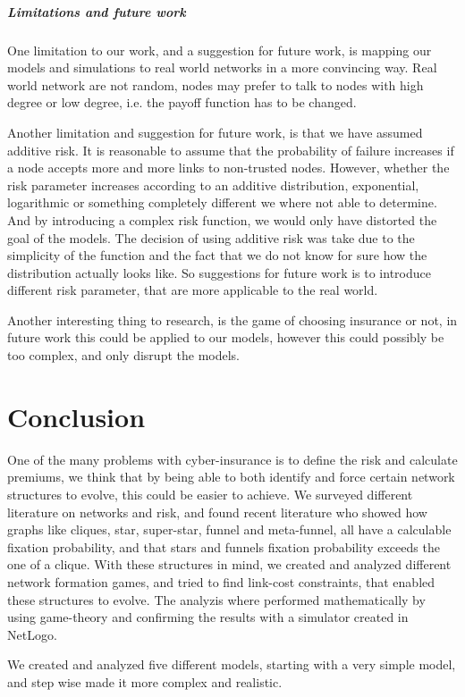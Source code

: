 \subparagraph{Limitations and future work}
One limitation to our work, and a suggestion for future work, is mapping our models and simulations to real world networks in a more convincing way. Real world network are not random, nodes may prefer to talk to nodes with high degree or low degree, i.e. the payoff function has to be changed. 

Another limitation and suggestion for future work, is that we have assumed additive risk. It is reasonable to assume that the probability of failure increases if a node accepts more and more links to non-trusted nodes. However, whether the risk parameter increases according to an additive distribution, exponential, logarithmic or something completely different we where not able to determine. And by introducing a complex risk function, we would only have distorted the goal of the models. The decision of using additive risk was take due to the simplicity of the function and the fact that we do not know for sure how the distribution actually looks like.
So suggestions for future work is to introduce different risk parameter, that are more applicable to the real world.

Another interesting thing to research, is the game of choosing insurance or not, in future work this could be applied to our models, however this could possibly be too complex, and only disrupt the models.

\section{Conclusion}

One of the many problems with cyber-insurance is to define the risk and calculate premiums, we think that by being able to both identify and force certain network structures to evolve, this could be easier to achieve.
We surveyed different literature on networks and risk, and found recent literature who showed how graphs like cliques, star, super-star, funnel and meta-funnel, all have a calculable fixation probability, and that stars and funnels fixation probability exceeds the one of a clique. 
With these structures in mind, we created and analyzed different network formation games, and tried to find link-cost constraints, that enabled these structures to evolve. 
The analyzis where performed mathematically by using game-theory and confirming the results with a simulator created in NetLogo.

We created and analyzed five different models, starting with a very simple model, and step wise made it more complex and realistic. 
  
